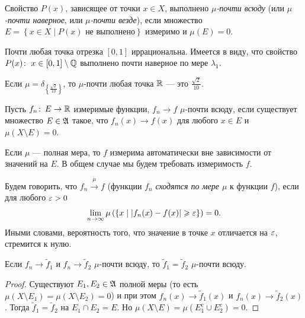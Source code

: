 \begin{df}
 Свойство $P(x)$, зависящее от точки $x \in X$, выполнено \textit{$\mu$-почти всюду} (или \textit{$\mu$-почти наверное}, или \textit{$\mu$-почти везде}), если множество $E = \left\{ x \in X \mid P(x) \text{ не выполнено} \right\}$ измеримо и $\mu(E) = 0$.
\end{df}
\newcommand{\lao}{\ensuremath \lambda_{1}}
\begin{exmpl}
 Почти любая точка отрезка $[0,1]$ иррациональна. Имеется в виду, что свойство $P(x) \colon\; x \in [0,1] \setminus \mathbb{Q}$ выполнено почти наверное по мере $\lambda_1$.
\end{exmpl}
\begin{exmpl}
 Если $\mu = \delta_{\left\{ \frac{\sqrt{2}}{10} \right\}}$, то $\mu$-почти любая точка $\mathbb{R}$ --- это $\frac{\sqrt{2}}{10}$.
\end{exmpl}
\begin{df}
 Пусть $f_n \colon\, E \to \mathbb{R}  $ измеримые функции, $f_n \to f$ $\mu$-почти всюду, если существует множество  $E \in \mathfrak{A}$ такое, что $f_n(x) \to f(x)$ для любого $x \in E$ и $\mu(X \setminus E) = 0$.
\end{df}
\begin{remrk}
 Если $\mu$ --- полная мера, то $f$ измерима автоматически вне зависимости от значений на $E$. В общем случае мы будем требовать измеримость $f$.
\end{remrk}
\begin{df}
 Будем говорить, что $f_n \xrightarrow{\mu} f$ (функции $f_n$ \textit{сходятся по мере $\mu$ } к функции $f$), если для любого $\varepsilon > 0$ \begin{align*}
  \lim_{n \to \infty} \mu \left( \left\{ x \mid \left| f_n(x) - f(x) \right| \geqslant \varepsilon  \right\} \right) = 0
 .\end{align*} Иными словами, вероятность того, что значение в точке $x$ отличается на $\varepsilon$, стремится к нулю.
\end{df}
\begin{remrk}
 Если $f_n \to \tilde f_1$ и $f_n \to \tilde f_2$ $\mu$-почти всюду, то $\tilde f_1 = \tilde f_2$ $\mu$-почти всюду.
\end{remrk}
\begin{proof}
 Существуют $E_1, E_2 \in \mathfrak{A}$ полной меры (то есть $\mu(X \setminus E_1) = \mu(X \setminus E_2) = 0$) и при этом $f_n(x) \to \tilde f_1(x)$ и $f_n(x) \to \tilde f_2(x)$. Тогда $\tilde f_1 = \tilde f_2$ на $E_1 \cap E_2 = E$. Но $\mu(X \setminus E) = \mu(E_1^{c} \cup E_2^{c}) = 0$.
\end{proof}
